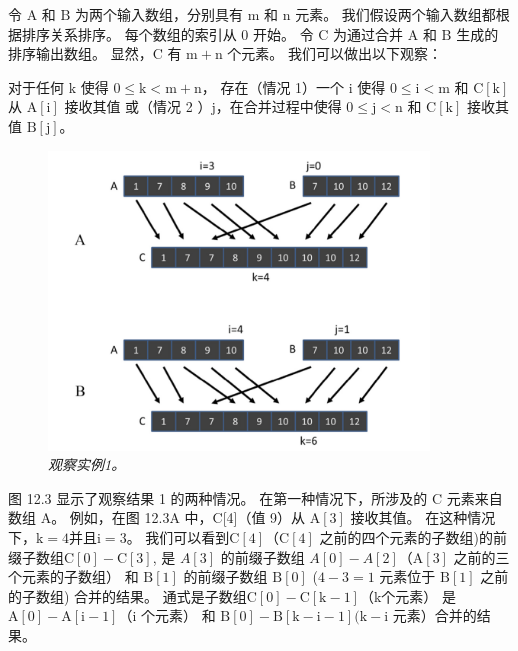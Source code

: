 令 $\mathrm{A}$ 和 $\mathrm{B}$ 为两个输入数组，分别具有 $\mathrm{m}$ 和 $\mathrm{n}$ 元素。 
我们假设两个输入数组都根据排序关系排序。 每个数组的索引从 0 开始。 
令 $\mathrm{C}$ 为通过合并 $\mathrm{A}$ 和 $\mathrm{B}$ 生成的排序输出数组。 
显然，$\mathrm{C}$ 有 $\mathrm{m}+\mathrm{n}$ 个元素。 我们可以做出以下观察：

\begin{Observation}
对于任何 $\mathrm{k}$ 使得 $0 \leq \mathrm{k}<\mathrm{m}+\mathrm{n}$，
存在（情况 1）一个 $\mathrm{i} $ 使得 $0 \leq \mathrm{i}<\mathrm{m}$ 
和 $\mathrm{C}[\mathrm{k}]$ 从 $\mathrm{A}[\mathrm{i}]$ 接收其值
或（情况 2 ）$\mathrm{j}$，在合并过程中使得 $0 \leq \mathrm{j}<\mathrm{n}$ 
和 $\mathrm{C}[\mathrm{k}]$ 接收其值 $\mathrm{B}[\mathrm{j}]$。
\end{Observation}

\begin{figure}[H]
	\centering
	\includegraphics[width=0.9\textwidth]{figs/F12.3.png}
	\caption{\textit{观察实例1。}}
\end{figure}

图 12.3 显示了观察结果 1 的两种情况。 在第一种情况下，所涉及的 $\mathrm{C}$ 元素来自数组 A。
例如，在图 12.3A 中，C[4]（值 9）从 $\mathrm{A}[3]$ 接收其值。 
在这种情况下，$\mathrm{k}=4$并且$\mathrm{i}=3$。 
我们可以看到$\mathrm{C}[4]$（$\mathrm{C}[4]$ 之前的四个元素的子数组)的前缀子数组$\mathrm{C}[0]-\mathrm{C}[3]$, 
是 $A[3]$ 的前缀子数组 $A[0]-A[2]$（$\mathrm{A}[3]$ 之前的三个元素的子数组）
和 $\mathrm{B}[1]$ 的前缀子数组 $\mathrm{B}[0]$ ($4-3=1$ 元素位于 $\mathrm{B}[1]$ 之前的子数组) 合并的结果。 
通式是子数组$\mathrm{C}[0]-\mathrm{C}[\mathrm{k}-1]$（k个元素）
是$\mathrm{A}[0]-\mathrm{A}[\mathrm{i}-1]$（i 个元素）
和 $\mathrm{B}[0]-\mathrm{B}[\mathrm{k}-\mathrm{i}-1] (\mathrm{k}-\mathrm{i}$ 元素）合并的结果。

